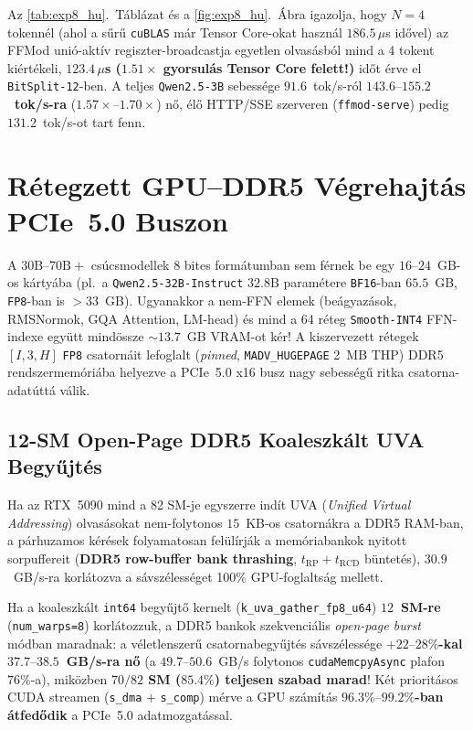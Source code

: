 \documentclass[10pt,twocolumn]{article}
\begin{document}
Az \ref{tab:exp8_hu}.\ Táblázat és a \ref{fig:exp8_hu}.\ Ábra igazolja, hogy $N=4$ tokennél (ahol a sűrű \texttt{cuBLAS} már Tensor Core-okat használ $186.5\,\mu$s idővel) az FFMod unió-aktív regiszter-broadcastja egyetlen olvasásból mind a 4 tokent kiértékeli, \textbf{$123.4\,\mu$s ($1.51\times$ gyorsulás Tensor Core felett!)} időt érve el \texttt{BitSplit-12}-ben. A teljes \texttt{Qwen2.5-3B} sebessége $91.6$~tok/s-ról \textbf{$143.6\text{--}155.2$~tok/s-ra} ($1.57\times\text{--}1.70\times$) nő, élő HTTP/SSE szerveren (\texttt{ffmod-serve}) pedig $131.2$~tok/s-ot tart fenn.

\section{Rétegzett GPU--DDR5 Végrehajtás PCIe~5.0 Buszon}
\label{sec:tiered}

A $30\text{B}\text{--}70\text{B}+$ csúcsmodellek 8 bites formátumban sem férnek be egy $16\text{--}24$~GB-os kártyába (pl.\ a \texttt{Qwen2.5-32B-Instruct} $32.8\text{B}$ paramétere \texttt{BF16}-ban $65.5$~GB, \texttt{FP8}-ban is $>33$~GB). Ugyanakkor a nem-FFN elemek (beágyazások, RMSNormok, GQA Attention, LM-head) és mind a 64 réteg \texttt{Smooth-INT4} FFN-indexe együtt mindössze $\sim 13.7$~GB VRAM-ot kér! A kiszervezett rétegek $[I, 3, H]$ \texttt{FP8} csatornáit lefoglalt (\emph{pinned}, \texttt{MADV\_HUGEPAGE} 2~MB THP) DDR5 rendszermemóriába helyezve a PCIe~5.0 x16 busz nagy sebességű ritka csatorna-adatúttá válik.

\subsection{12-SM Open-Page DDR5 Koaleszkált UVA Begyűjtés}
Ha az RTX~5090 mind a 82 SM-je egyszerre indít UVA (\emph{Unified Virtual Addressing}) olvasásokat nem-folytonos $15$~KB-os csatornákra a DDR5 RAM-ban, a párhuzamos kérések folyamatosan felülírják a memóriabankok nyitott sorpuffereit (\textbf{DDR5 row-buffer bank thrashing}, $t_{\mathrm{RP}}+t_{\mathrm{RCD}}$ büntetés), $30.9$~GB/s-ra korlátozva a sávszélességet 100\% GPU-foglaltság mellett.

Ha a koaleszkált \texttt{int64} begyűjtő kernelt (\texttt{k\_uva\_gather\_fp8\_u64}) \textbf{$12$~SM-re} (\texttt{num\_warps=8}) korlátozzuk, a DDR5 bankok szekvenciális \emph{open-page burst} módban maradnak: a véletlenszerű csatornabegyűjtés sávszélessége \textbf{$+22\text{--}28\%$-kal $37.7\text{--}38.5$~GB/s-ra nő} (a $49.7\text{--}50.6$~GB/s folytonos \texttt{cudaMemcpyAsync} plafon $76\%$-a), miközben \textbf{$70/82$ SM ($85.4\%$) teljesen szabad marad}! Két prioritásos CUDA streamen (\texttt{s\_dma} + \texttt{s\_comp}) mérve a GPU számítás \textbf{$96.3\%\text{--}99.2\%$-ban átfedődik} a PCIe~5.0 adatmozgatással.
\end{document}
